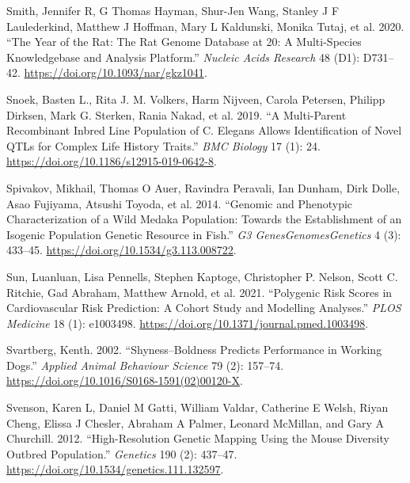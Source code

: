 \documentclass[
]{book}
\newlength{\cslhangindent}
\newlength{\cslentryspacingunit} %
\newenvironment{CSLReferences}[2] %
 {%
  \setlength{\parindent}{0pt}
  \ifodd #1
  \let\oldpar\par
  \def\par{\hangindent=\cslhangindent\oldpar}
  \fi
  \setlength{\parskip}{#2\cslentryspacingunit}
 }%
 {}
\begin{document}
\begin{CSLReferences}{1}{0}
\leavevmode{}%
Smith, Jennifer R, G Thomas Hayman, Shur-Jen Wang, Stanley J F Laulederkind, Matthew J Hoffman, Mary L Kaldunski, Monika Tutaj, et al. 2020. {``The {Year} of the {Rat}: {The Rat Genome Database} at 20: A Multi-Species Knowledgebase and Analysis Platform.''} \emph{Nucleic Acids Research} 48 (D1): D731--42. \url{https://doi.org/10.1093/nar/gkz1041}.

\leavevmode{}%
Snoek, Basten L., Rita J. M. Volkers, Harm Nijveen, Carola Petersen, Philipp Dirksen, Mark G. Sterken, Rania Nakad, et al. 2019. {``A Multi-Parent Recombinant Inbred Line Population of {C}. Elegans Allows Identification of Novel {QTLs} for Complex Life History Traits.''} \emph{BMC Biology} 17 (1): 24. \url{https://doi.org/10.1186/s12915-019-0642-8}.

\leavevmode{}%
Spivakov, Mikhail, Thomas O Auer, Ravindra Peravali, Ian Dunham, Dirk Dolle, Asao Fujiyama, Atsushi Toyoda, et al. 2014. {``Genomic and {Phenotypic Characterization} of a {Wild Medaka Population}: {Towards} the {Establishment} of an {Isogenic Population Genetic Resource} in {Fish}.''} \emph{G3 Genes\textbar Genomes\textbar Genetics} 4 (3): 433--45. \url{https://doi.org/10.1534/g3.113.008722}.

\leavevmode{}%
Sun, Luanluan, Lisa Pennells, Stephen Kaptoge, Christopher P. Nelson, Scott C. Ritchie, Gad Abraham, Matthew Arnold, et al. 2021. {``Polygenic Risk Scores in Cardiovascular Risk Prediction: {A} Cohort Study and Modelling Analyses.''} \emph{PLOS Medicine} 18 (1): e1003498. \url{https://doi.org/10.1371/journal.pmed.1003498}.

\leavevmode{}%
Svartberg, Kenth. 2002. {``Shyness--Boldness Predicts Performance in Working Dogs.''} \emph{Applied Animal Behaviour Science} 79 (2): 157--74. \url{https://doi.org/10.1016/S0168-1591(02)00120-X}.

\leavevmode{}%
Svenson, Karen L, Daniel M Gatti, William Valdar, Catherine E Welsh, Riyan Cheng, Elissa J Chesler, Abraham A Palmer, Leonard McMillan, and Gary A Churchill. 2012. {``High-{Resolution Genetic Mapping Using} the {Mouse Diversity Outbred Population}.''} \emph{Genetics} 190 (2): 437--47. \url{https://doi.org/10.1534/genetics.111.132597}.


\end{CSLReferences}
\end{document}
